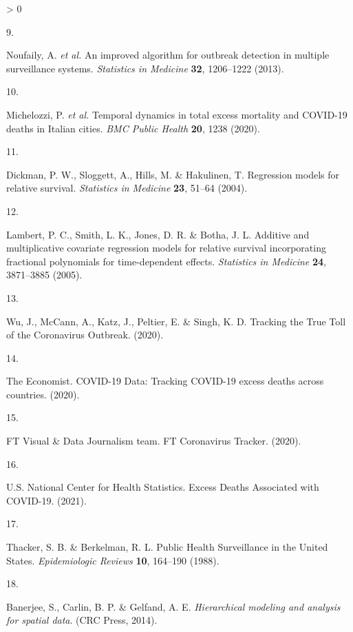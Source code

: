 \documentclass[
]{article}
\newlength{\cslhangindent}
\newlength{\csllabelwidth}
\newenvironment{CSLReferences}[2] %
 {%
  \setlength{\parindent}{0pt}
  \ifodd #1 \everypar{\setlength{\hangindent}{\cslhangindent}}\ignorespaces\fi
  \ifnum #2 > 0
  \setlength{\parskip}{#2\baselineskip}
  \fi
 }%
 {}
\newcommand{\CSLLeftMargin}[1]{\parbox[t]{\csllabelwidth}{#1}}
\newcommand{\CSLRightInline}[1]{\parbox[t]{\linewidth - \csllabelwidth}{#1}\break}
\begin{document}
\begin{CSLReferences}{0}{0}
\leavevmode\hypertarget{ref-Noufaily2013}{}%
\CSLLeftMargin{9. }
\CSLRightInline{Noufaily, A. \emph{et al.} {An improved algorithm for outbreak detection in multiple surveillance systems}. \emph{Statistics in Medicine} \textbf{32}, 1206--1222 (2013).}

\leavevmode\hypertarget{ref-Michelozzi2020}{}%
\CSLLeftMargin{10. }
\CSLRightInline{Michelozzi, P. \emph{et al.} {Temporal dynamics in total excess mortality and COVID-19 deaths in Italian cities}. \emph{BMC Public Health} \textbf{20}, 1238 (2020).}

\leavevmode\hypertarget{ref-Dickman2004}{}%
\CSLLeftMargin{11. }
\CSLRightInline{Dickman, P. W., Sloggett, A., Hills, M. \& Hakulinen, T. {Regression models for relative survival}. \emph{Statistics in Medicine} \textbf{23}, 51--64 (2004).}

\leavevmode\hypertarget{ref-Lambert2005}{}%
\CSLLeftMargin{12. }
\CSLRightInline{Lambert, P. C., Smith, L. K., Jones, D. R. \& Botha, J. L. {Additive and multiplicative covariate regression models for relative survival incorporating fractional polynomials for time-dependent effects}. \emph{Statistics in Medicine} \textbf{24}, 3871--3885 (2005).}

\leavevmode\hypertarget{ref-Wu2020}{}%
\CSLLeftMargin{13. }
\CSLRightInline{Wu, J., McCann, A., Katz, J., Peltier, E. \& Singh, K. D. {Tracking the True Toll of the Coronavirus Outbreak}. (2020).}

\leavevmode\hypertarget{ref-TheEconomist2020}{}%
\CSLLeftMargin{14. }
\CSLRightInline{The Economist. {COVID-19 Data: Tracking COVID-19 excess deaths across countries}. (2020).}

\leavevmode\hypertarget{ref-FTVisualDataJournalismteam2020}{}%
\CSLLeftMargin{15. }
\CSLRightInline{FT Visual \& Data Journalism team. {FT Coronavirus Tracker}. (2020).}

\leavevmode\hypertarget{ref-U.S.NationalCenterforHealthStatistics2021}{}%
\CSLLeftMargin{16. }
\CSLRightInline{U.S. National Center for Health Statistics. {Excess Deaths Associated with COVID-19}. (2021).}

\leavevmode\hypertarget{ref-Thacker1988}{}%
\CSLLeftMargin{17. }
\CSLRightInline{Thacker, S. B. \& Berkelman, R. L. {Public Health Surveillance in the United States}. \emph{Epidemiologic Reviews} \textbf{10}, 164--190 (1988).}

\leavevmode\hypertarget{ref-Banerjee2014}{}%
\CSLLeftMargin{18. }
\CSLRightInline{Banerjee, S., Carlin, B. P. \& Gelfand, A. E. \emph{{Hierarchical modeling and analysis for spatial data}}. (CRC Press, 2014).}


\end{CSLReferences}
\end{document}
